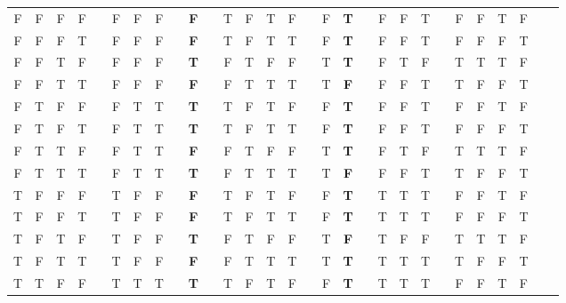 \documentclass[a4paper,12pt]{article}
\begin{document}
\begin{enumerate}[label=\arabic*,leftmargin=*]
\begin{enumerate}[label=\arabic*.]
\begin{minipage}{\textwidth}
{\begin{tabular}{c c c c | c c c c c c c c c c c c | c c c c c c c c c c c c c}
                        \hline
                        F & F & F & F &   & F & F & F &   & \textbf{F} &   & T  & F & T & F &   & F & \textbf{T} &   & F & F    & T  &   & F & F  & T  & F &   &  \\
                        F & F & F & T &   & F & F & F &   & \textbf{F} &   & T  & F & T & T &   & F & \textbf{T} &   & F & F    & T  &   & F & F  & F  & T &   &  \\
                        F & F & T & F &   & F & F & F &   & \textbf{T} &   & F  & T & F & F &   & T & \textbf{T} &   & F & T    & F  &   & T & T  & T  & F &   &  \\
                        F & F & T & T &   & F & F & F &   & \textbf{F} &   & F  & T & T & T &   & T & \textbf{F} &   & F & F    & T  &   & T & F  & F  & T &   &  \\
                        F & T & F & F &   & F & T & T &   & \textbf{T} &   & T  & F & T & F &   & F & \textbf{T} &   & F & F    & T  &   & F & F  & T  & F &   &  \\
                        F & T & F & T &   & F & T & T &   & \textbf{T} &   & T  & F & T & T &   & F & \textbf{T} &   & F & F    & T  &   & F & F  & F  & T &   &  \\
                        F & T & T & F &   & F & T & T &   & \textbf{F} &   & F  & T & F & F &   & T & \textbf{T} &   & F & T    & F  &   & T & T  & T  & F &   &  \\
                        F & T & T & T &   & F & T & T &   & \textbf{T} &   & F  & T & T & T &   & T & \textbf{F} &   & F & F    & T  &   & T & F  & F  & T &   &  \\
                        T & F & F & F &   & T & F & F &   & \textbf{F} &   & T  & F & T & F &   & F & \textbf{T} &   & T & T    & T  &   & F & F  & T  & F &   &  \\
                        T & F & F & T &   & T & F & F &   & \textbf{F} &   & T  & F & T & T &   & F & \textbf{T} &   & T & T    & T  &   & F & F  & F  & T &   &  \\
                        T & F & T & F &   & T & F & F &   & \textbf{T} &   & F  & T & F & F &   & T & \textbf{F} &   & T & F    & F  &   & T & T  & T  & F &   &  \\
                        T & F & T & T &   & T & F & F &   & \textbf{F} &   & F  & T & T & T &   & T & \textbf{T} &   & T & T    & T  &   & T & F  & F  & T &   &  \\
                        T & T & F & F &   & T & T & T &   & \textbf{T} &   & T  & F & T & F &   & F & \textbf{T} &   & T & T    & T  &   & F & F  & T  & F &   &  \\

\end{tabular}}
\end{minipage}
\end{enumerate}
\end{enumerate}
\end{document}
